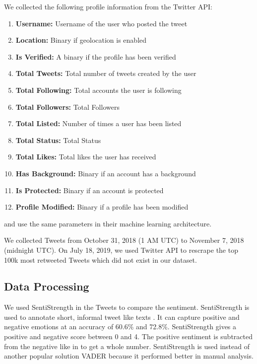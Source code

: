 \documentclass[letterpaper]{article}
\begin{document}
We collected the following profile information from the Twitter API:
\begin{enumerate}[label=\textbf{\arabic*}]
    \item \textbf{Username:} Username of the user who posted the tweet
    \item \textbf{Location:} Binary if geolocation is enabled
    \item \textbf{Is Verified:} A binary if the profile has been verified
    \item \textbf{Total Tweets:} Total number of tweets created by the user
    \item \textbf{Total Following:} Total accounts the user is following
    \item \textbf{Total Followers:} Total Followers
    \item \textbf{Total Listed:} Number of times a user has been listed
    \item \textbf{Total Status:} Total Status
    \item \textbf{Total Likes:} Total likes the user has received
    \item \textbf{Has Background:}  Binary if an account has a background
    \item \textbf{Is Protected:}  Binary if an account is protected
    \item \textbf{Profile Modified:}  Binary if a profile has been modified
\end{enumerate}
\bigskip
\cite{kudugunta2018deep} and \cite{ferrara2017disinformation} use the same parameters in their machine learning 
architecture. \par

We collected Tweets from October 31, 2018 (1 AM UTC) to November 7, 2018 (midnight UTC). On July 18, 2019, we used 
Twitter API to rescrape the top 100k most retweeted Tweets which did not exist in our dataset.

\subsection{Data Processing}
We used SentiStrength in the Tweets to compare the sentiment. SentiStrength \cite{thelwall2010sentiment} is used 
to annotate short, informal tweet like texts \cite{bessi2016social}. 
It can capture positive and negative emotions at an accuracy of 60.6\% and 72.8\%. SentiStrength gives a positive 
and negative score between 0 and 4. The positive sentiment is subtracted from the negative like in \cite{bessi2016social} to get a whole number. SentiStrength is used instead of another 
popular solution VADER because it performed better in manual analysis.
\end{document}
